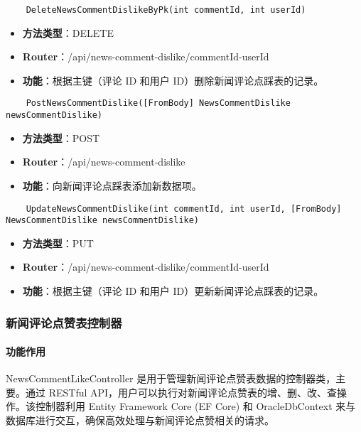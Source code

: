 \begin{verbatim}
	DeleteNewsCommentDislikeByPk(int commentId, int userId)
\end{verbatim}

\begin{itemize}
	\item \textbf{方法类型}：DELETE
	\item \textbf{Router}：/api/news-comment-dislike/{commentId}-{userId}
	\item \textbf{功能}：根据主键（评论 ID 和用户 ID）删除新闻评论点踩表的记录。
\end{itemize}

\begin{verbatim}
	PostNewsCommentDislike([FromBody] NewsCommentDislike newsCommentDislike)
\end{verbatim}

\begin{itemize}
	\item \textbf{方法类型}：POST
	\item \textbf{Router}：/api/news-comment-dislike
	\item \textbf{功能}：向新闻评论点踩表添加新数据项。
\end{itemize}

\begin{verbatim}
	UpdateNewsCommentDislike(int commentId, int userId, [FromBody] NewsCommentDislike newsCommentDislike)
\end{verbatim}

\begin{itemize}
	\item \textbf{方法类型}：PUT
	\item \textbf{Router}：/api/news-comment-dislike/{commentId}-{userId}
	\item \textbf{功能}：根据主键（评论 ID 和用户 ID）更新新闻评论点踩表的记录。
\end{itemize}

\subsubsection{新闻评论点赞表控制器}

\paragraph{功能作用}

NewsCommentLikeController 是用于管理新闻评论点赞表数据的控制器类，主要。通过 RESTful API，用户可以执行对新闻评论点赞表的增、删、改、查操作。该控制器利用 Entity Framework Core (EF Core) 和 OracleDbContext 来与数据库进行交互，确保高效处理与新闻评论点赞相关的请求。

